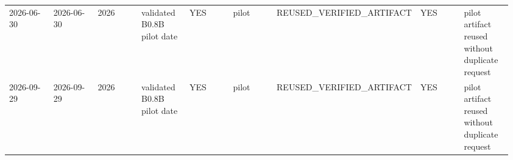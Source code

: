 \begin{longtable}{P{0.1067\linewidth}P{0.1067\linewidth}P{0.1067\linewidth}P{0.1067\linewidth}P{0.1067\linewidth}P{0.1067\linewidth}P{0.1067\linewidth}P{0.1067\linewidth}P{0.1067\linewidth}}
2026-06-30 & 2026-06-30 & 2026 & validated B0.8B pilot date & YES & pilot & REUSED\_VERIFIED\_ARTIFACT & YES & pilot artifact reused without duplicate request \\
2026-09-29 & 2026-09-29 & 2026 & validated B0.8B pilot date & YES & pilot & REUSED\_VERIFIED\_ARTIFACT & YES & pilot artifact reused without duplicate request \\
\bottomrule
\end{longtable}
\endgroup
